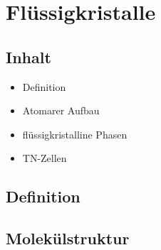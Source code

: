\section{Flüssigkristalle}

\subsection{Inhalt}
\begin{itemize}
\item Definition
\item  Atomarer Aufbau
\item flüssigkristalline Phasen
\item TN-Zellen
\end{itemize}

\subsection{Definition}

\subsection{Molekülstruktur}

